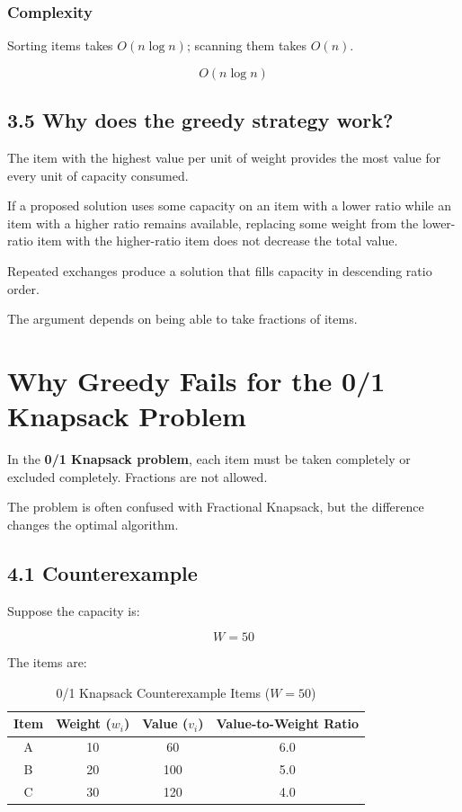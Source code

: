 \subsubsection{Complexity}

Sorting items takes $O(n\log n)$; scanning them takes $O(n)$.


\[
\boxed{O(n\log n)}
\]


\subsection{3.5 Why does the greedy strategy work?}

The item with the highest value per unit of weight provides the most value for every unit of capacity consumed.

If a proposed solution uses some capacity on an item with a lower ratio while an item with a higher ratio remains available, replacing some weight from the lower-ratio item with the higher-ratio item does not decrease the total value.

Repeated exchanges produce a solution that fills capacity in descending ratio order.

The argument depends on being able to take fractions of items.

\section{Why Greedy Fails for the 0/1 Knapsack Problem}

In the \textbf{0/1 Knapsack problem}, each item must be taken completely or excluded completely. Fractions are not allowed.

The problem is often confused with Fractional Knapsack, but the difference changes the optimal algorithm.

\subsection{4.1 Counterexample}

Suppose the capacity is:


\[
W=50
\]


The items are:

\begin{table}[htbp]
\centering
\caption{0/1 Knapsack Counterexample Items ($W = 50$)}
\label{tab:knapsack_counterexample}
\begin{tabular}{cccc}
\toprule
\textbf{Item} & \textbf{Weight ($w_i$)} & \textbf{Value ($v_i$)} & \textbf{Value-to-Weight Ratio} \\
\midrule
A & 10 & 60 & 6.0 \\
B & 20 & 100 & 5.0 \\
C & 30 & 120 & 4.0 \\
\bottomrule
\end{tabular}
\end{table}


